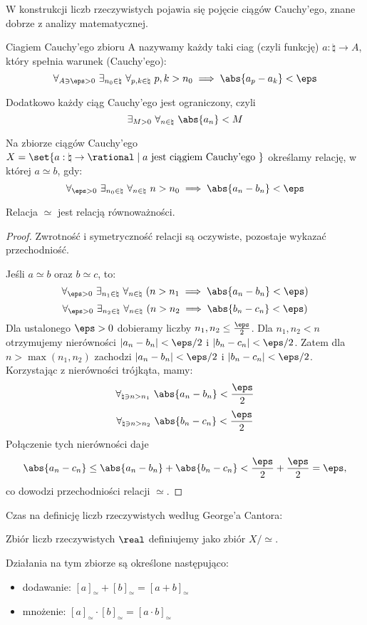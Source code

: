W konstrukcji liczb rzeczywistych pojawia się pojęcie ciągów Cauchy'ego, znane dobrze z analizy matematycznej.
\begin{definition}
    Ciagiem Cauchy'ego zbioru A nazywamy każdy taki ciag (czyli funkcję) \( a : \natural \rightarrow A \), który spełnia warunek (Cauchy'ego):
    \[
        \forall_{A \ni \eps > 0} \ \exists_{n_0 \in \natural} \ \forall_{p,k \in \natural} \ p,k > n_0 \implies \abs{a_p - a_k} < \eps
    \]
\end{definition}
Dodatkowo każdy ciąg Cauchy'ego jest ograniczony, czyli
\[
    \exists_{M > 0} \ \forall_{n \in \natural} \ \abs{a_n} < M
\]

\begin{definition}
    Na zbiorze ciągów Cauchy'ego \( X = \set{a : \natural \rightarrow \rational \mid a \text{ jest ciągiem Cauchy'ego }} \) określamy relację, w której \( a \simeq b \), gdy:
    \[
        \forall_{\eps > 0} \ \exists_{n_0 \in \natural} \ \forall_{n \in \natural} \ n > n_0 \implies \abs{a_n - b_n} < \eps
    \]
\end{definition}
\begin{lemma}
    Relacja \( \simeq \) jest relacją równoważności.
\end{lemma}
\begin{proof}

    Zwrotność i symetryczność relacji są oczywiste, pozostaje wykazać przechodniość. 
    
    Jeśli \( a \simeq b \) oraz \( b \simeq c \), to:
    \[
        \forall_{\eps > 0} \ \exists_{n_1 \in \natural} \ \forall_{n \in \natural} \ (n > n_1 \implies \abs{a_n - b_n} < \eps)
    \]
    \[
        \forall_{\eps > 0} \ \exists_{n_2 \in \natural} \ \forall_{n \in \natural} \ (n > n_2 \implies \abs{b_n - c_n} < \eps)
    \]
    Dla ustalonego \( \eps > 0 \) dobieramy liczby \( n_1, n_2 \leq \frac{\eps}{2} \). Dla \( n_1, n_2 < n \) otrzymujemy nierówności \( |a_n - b_n| < \eps / 2 \) i \( |b_n - c_n| < \eps / 2 \).
    Zatem dla \( n > \max(n_1, n_2) \) zachodzi \( |a_n - b_n| < \eps / 2 \) i \( |b_n - c_n| < \eps / 2 \). Korzystając z nierówności trójkąta, mamy:
    \[
        \forall_{\natural \ni n > n_1} \ \abs{a_n - b_n} < \frac{\eps}{2}
    \]
    \[
        \forall_{\natural \ni n > n_2} \ \abs{b_n - c_n} < \frac{\eps}{2}
    \]
    Połączenie tych nierówności daje
    \[
        \abs{a_n - c_n} \leq \abs{a_n - b_n} + \abs{b_n - c_n} < \frac{\eps}{2} + \frac{\eps}{2} = \eps,
    \]
    co dowodzi przechodniości relacji \( \simeq \).
\end{proof}
                        
Czas na definicję liczb rzeczywistych według George'a Cantora:
\begin{definition}
    Zbiór liczb rzeczywistych \( \real \) definiujemy jako zbiór \( X/\simeq \).    
\end{definition}
Działania na tym zbiorze są określone następująco:
\begin{itemize}
    \item dodawanie: \( [a]_{\simeq} + [b]_{\simeq} = [a + b]_{\simeq} \)
    \item mnożenie: \( [a]_{\simeq} \cdot [b]_{\simeq} = [a \cdot b]_{\simeq} \)
\end{itemize}